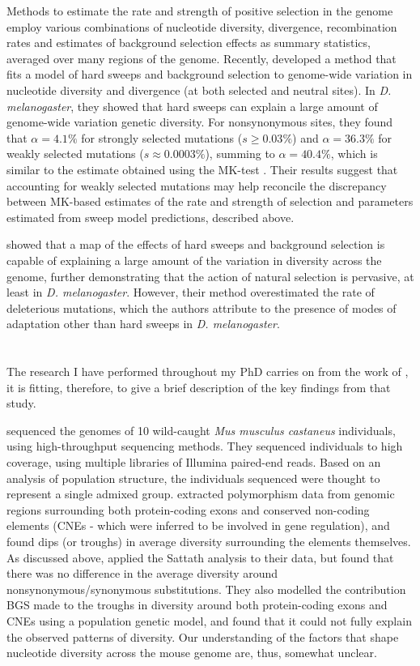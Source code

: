 	Methods to estimate the rate and strength of positive selection in the genome employ various combinations of nucleotide diversity, divergence, recombination rates and estimates of background selection effects as summary statistics, averaged over many regions of the genome. Recently, \cite{RN274} developed a method that fits a model of hard sweeps and background selection to genome-wide variation in nucleotide diversity and divergence (at both selected and neutral sites). In \textit{D. melanogaster}, they showed that hard sweeps can explain a large amount of genome-wide variation genetic diversity. For nonsynonymous sites, they found that $\alpha = 4.1\%$ for strongly selected mutations ($s \geq 0.03\%$) and $\alpha = 36.3\%$ for weakly selected mutations ($s \approx 0.0003\%$), summing to $\alpha = 40.4\%$, which is similar to the estimate obtained using the MK-test \citep{RN283}. Their results suggest that accounting for weakly selected mutations may help reconcile the discrepancy between MK-based estimates of the rate and strength of selection and parameters estimated from sweep model predictions, described above.

\cite{RN274} showed that a map of the effects of hard sweeps and background selection is capable of explaining a large amount of the variation in diversity across the genome, further demonstrating that the action of natural selection is pervasive, at least in \textit{D. melanogaster}. However, their method overestimated the rate of deleterious mutations, which the authors attribute to the presence of modes of adaptation other than hard sweeps in \textit{D. melanogaster}. 

\section[\cite{RN122}]{\cite{RN122}}


	The research I have performed throughout my PhD carries on from the work of \cite{RN122}, it is fitting, therefore, to give a brief description of the key findings from that study.
	
	\cite{RN122} sequenced the genomes of 10 wild-caught \textit{Mus musculus castaneus} individuals, using high-throughput sequencing methods. They sequenced individuals to high coverage, using multiple libraries of Illumina paired-end reads. Based on an analysis of population structure, the individuals sequenced were thought to represent a single admixed group. \cite{RN122} extracted polymorphism data from genomic regions surrounding both protein-coding exons and conserved non-coding elements (CNEs - which were inferred to be involved in gene regulation), and found dips (or troughs) in average diversity surrounding the elements themselves. As discussed above, \cite{RN122} applied the Sattath analysis to their data, but found that there was no difference in the average diversity around nonsynonymous/synonymous substitutions. They also modelled the contribution BGS made to the troughs in diversity around both protein-coding exons and CNEs using a population genetic model, and found that it could not fully explain the observed patterns of diversity. Our understanding of the factors that shape nucleotide diversity across the mouse genome are, thus, somewhat unclear.

